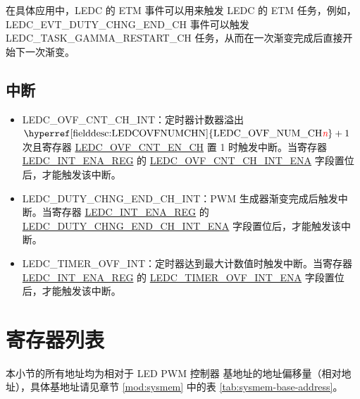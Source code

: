 \documentclass[main\_\_CN.tex]{subfiles}
\begin{document}
在具体应用中，LEDC 的 ETM 事件可以用来触发 LEDC 的 ETM 任务，例如，LEDC\_EVT\_DUTY\_CHNG\_END\_CH 事件可以触发LEDC\_TASK\_GAMMA\_RESTART\_CH 任务，从而在一次渐变完成后直接开始下一次渐变。

\subsection{中断}
\begin{itemize}
\item \label{int:ledc-ovf-cnt}LEDC\_OVF\_CNT\_CH\_INT：定时器计数器溢出 $ \textrm{\hyperref[fielddesc:LEDCOVFNUMCHN]{LEDC\_OVF\_NUM\_CH\regindex{n}}} + 1 $ 次且寄存器 \hyperref[fielddesc:LEDCOVFCNTENCHN]{LEDC\_OVF\_CNT\_EN\_CH} 置 1 时触发中断。当寄存器 \hyperref[regdesc:LEDCINTENAREG]{LEDC\_INT\_ENA\_REG} 的 \hyperref[fielddesc:LEDCOVFCNTCHNINTENA]{LEDC\_OVF\_CNT\_CH\_INT\_ENA} 字段置位后，才能触发该中断。
\item \label{int:ledc-duty-chng-end}LEDC\_DUTY\_CHNG\_END\_CH\_INT：PWM 生成器渐变完成后触发中断。当寄存器 \hyperref[regdesc:LEDCINTENAREG]{LEDC\_INT\_ENA\_REG} 的 \hyperref[fielddesc:LEDCDUTYCHNGENDCHNINTENA]{LEDC\_DUTY\_CHNG\_END\_CH\_INT\_ENA} 字段置位后，才能触发该中断。
\item \label{int:ledc-timer-ovf}LEDC\_TIMER\_OVF\_INT：定时器达到最大计数值时触发中断。当寄存器 \hyperref[regdesc:LEDCINTENAREG]{LEDC\_INT\_ENA\_REG} 的 \hyperref[fielddesc:LEDCTIMERXOVFINTENA]{LEDC\_TIMER\_OVF\_INT\_ENA} 字段置位后，才能触发该中断。
\end{itemize}





\clearpage
\hypertarget{ledc-reg-summ}{}
\section{寄存器列表}
\label{sec:ledc-reg-summ}


本小节的所有地址均为相对于 LED PWM 控制器 基地址的地址偏移量（相对地址），具体基地址请见章节 \ref{mod:sysmem} \textit{} 中的表 \ref{tab:sysmem-base-address}。
\end{document}
